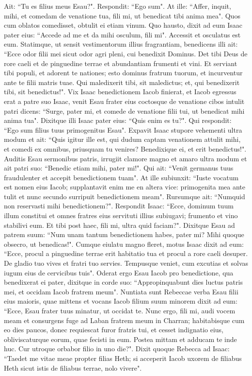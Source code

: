 \begin{biblechapter}
\verse Ait: “Tu es filius meus Esau?". Respondit: “Ego sum". 
\verse At ille: “Affer, inquit, mihi, et comedam de venatione tua, fili mi, ut benedicat tibi anima mea". Quos cum oblatos comedisset, obtulit ei etiam vinum. Quo hausto, 
\verse dixit ad eum Isaac pater eius: “Accede ad me et da mihi osculum, fili mi". 
\verse Accessit et osculatus est eum. Statimque, ut sensit vestimentorum illius fragrantiam, benedicens illi ait: “Ecce odor filii mei sicut odor agri pleni, cui benedixit Dominus. 
\verse Det tibi Deus de rore caeli et de pinguedine terrae et abundantiam frumenti et vini. 
\verse Et serviant tibi populi, et adorent te nationes; esto dominus fratrum tuorum, et incurventur ante te filii matris tuae. Qui maledixerit tibi, sit maledictus; et, qui benedixerit tibi, sit benedictus!". 
\verse Vix Isaac benedictionem Iacob finierat, et Iacob egressus erat a patre suo Isaac, venit Esau frater eius 
\verse coctosque de venatione cibos intulit patri dicens: “Surge, pater mi, et comede de venatione filii tui, ut benedicat mihi anima tua". 
\verse Dixitque illi Isaac pater eius: “Quis enim es tu?". Qui respondit: “Ego sum filius tuus primogenitus Esau". 
\verse Expavit Isaac stupore vehementi ultra modum et ait: “Quis igitur ille est, qui dudum captam venationem attulit mihi, et comedi ex omnibus, priusquam tu venires? Benedixique ei, et erit benedictus!". 
\verse Auditis Esau sermonibus patris, irrugiit clamore magno et amaro ultra modum et ait patri suo: “Benedic etiam mihi, pater mi!". 
\verse Qui ait: “Venit germanus tuus fraudulenter et accepit benedictionem tuam". 
\verse At ille subiunxit: “Iuste vocatum est nomen eius Iacob; supplantavit enim me en altera vice: primogenita mea ante tulit et nunc secundo surripuit benedictionem meam". Rursumque ait: “Numquid non reservasti mihi benedictionem?". 
\verse Respondit Isaac: “Ecce, dominum tuum illum constitui et omnes fratres eius servituti illius subiugavi; frumento et vino stabilivi eum. Et tibi post haec, fili mi, ultra quid faciam?". 
\verse Dixitque Esau ad patrem suum: “Num unam tantum benedictionem habes, pater mi? Mihi quoque obsecro, ut benedicas!". Cumque eiulatu magno fleret, 
\verse motus Isaac dixit ad eum: “Ecce, procul a pinguedine terrae erit habitatio tua et procul a rore caeli desuper. 
\verse De gladio tuo vives et fratri tuo servies. Tempusque veniet, cum excutias et solvas iugum eius de cervicibus tuis". 
\verse Oderat ergo Esau Iacob pro benedictione, qua benedixerat ei pater, dixitque in corde suo: “Appropinquabunt dies luctus patris mei, et occidam Iacob fratrem meum". 
\verse Nuntiata sunt Rebeccae verba Esau filii eius maioris, quae mittens et vocans Iacob filium suum minorem dixit ad eum: “Ecce, Esau frater tuus minatur, ut occidat te. 
\verse Nunc ergo, fili mi, audi vocem meam et consurgens fuge ad Laban fratrem meum in Charran; 
\verse habitabisque cum eo dies paucos, donec requiescat furor fratris tui, 
\verse et cesset indignatio eius, obliviscaturque eorum, quae fecisti in eum. Postea mittam et adducam te inde huc. Cur utroque orbabor filio in uno die?". 
\verse Dixit quoque Rebecca ad Isaac: “Taedet me vitae meae propter filias Heth; si acceperit Iacob uxorem de filiabus Heth sicut istis de filiabus terrae, nolo vivere". 
\end{biblechapter}

